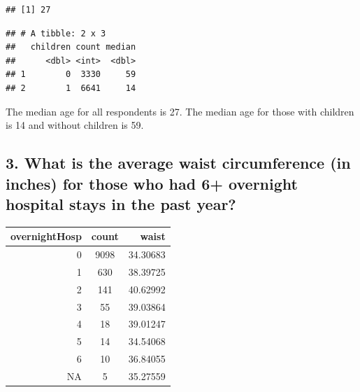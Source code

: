 \documentclass[]{article}
\newenvironment{Shaded}{\begin{snugshade}}{\end{snugshade}}
\newcommand{\DataTypeTok}[1]{\textcolor[rgb]{0.13,0.29,0.53}{#1}}
\newcommand{\KeywordTok}[1]{\textcolor[rgb]{0.13,0.29,0.53}{\textbf{#1}}}
\newcommand{\NormalTok}[1]{#1}
\newcommand{\OperatorTok}[1]{\textcolor[rgb]{0.81,0.36,0.00}{\textbf{#1}}}
\newcommand{\OtherTok}[1]{\textcolor[rgb]{0.56,0.35,0.01}{#1}}
\newcommand{\StringTok}[1]{\textcolor[rgb]{0.31,0.60,0.02}{#1}}
\begin{document}
\begin{verbatim}
## [1] 27
\end{verbatim}

\begin{Shaded}
\end{Shaded}

\begin{verbatim}
## # A tibble: 2 x 3
##   children count median
##      <dbl> <int>  <dbl>
## 1        0  3330     59
## 2        1  6641     14
\end{verbatim}

The median age for all respondents is 27. The median age for those with
children is 14 and without children is 59.

\hypertarget{what-is-the-average-waist-circumference-in-inches-for-those-who-had-6-overnight-hospital-stays-in-the-past-year}{%
\subsection{3. What is the average waist circumference (in inches) for
those who had 6+ overnight hospital stays in the past
year?}\label{what-is-the-average-waist-circumference-in-inches-for-those-who-had-6-overnight-hospital-stays-in-the-past-year}}

\begin{Shaded}
\end{Shaded}

\captionsetup[table]{labelformat=empty,skip=1pt}
\begin{longtable}{rcr}
\toprule
overnightHosp & count & waist \\ 
\midrule
0 & 9098 & 34.30683 \\ 
1 & 630 & 38.39725 \\ 
2 & 141 & 40.62992 \\ 
3 & 55 & 39.03864 \\ 
4 & 18 & 39.01247 \\ 
5 & 14 & 34.54068 \\ 
6 & 10 & 36.84055 \\ 
NA & 5 & 35.27559 \\ 
\bottomrule
\end{longtable}
\end{document}
